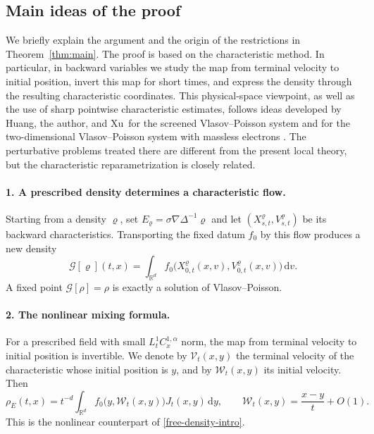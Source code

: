\documentclass[11pt]{article}
\newcommand{\R}{\mathbb R}
\newcommand{\dd}{\,\mathrm d}
\begin{document}
\subsection{Main ideas of the proof}

We briefly explain the argument and the origin of the restrictions in
Theorem~\ref{thm:main}.  The proof is based on the characteristic method.  In
particular, in backward variables we study the map from terminal velocity to
initial position, invert this map for short times, and express the density
through the resulting characteristic coordinates.  This physical-space
viewpoint, as well as the use of sharp pointwise characteristic estimates,
follows ideas developed by Huang, the author, and Xu\ for the screened Vlasov--Poisson system and for the
two-dimensional Vlasov--Poisson system with massless electrons
\cite{HNXscreened,HNX2d}.  The perturbative problems treated there are
different from the present local theory, but the characteristic
reparametrization is closely related.

\paragraph{1. A prescribed density determines a characteristic flow.}
Starting from a density $\varrho$, set
$E_\varrho=\sigma\nabla\Delta^{-1}\varrho$ and let
$(X_{s,t}^\varrho,V_{s,t}^\varrho)$ be its backward characteristics.
Transporting the fixed datum $f_0$ by this flow
produces a new density
\begin{equation*}
 \mathcal G[\varrho](t,x)
 =\int_{\R^d}f_0\bigl(X_{0,t}^\varrho(x,v),
                         V_{0,t}^\varrho(x,v)\bigr)\dd v.
\end{equation*}
A fixed point $\mathcal G[\rho]=\rho$ is exactly a solution of
Vlasov--Poisson.

\paragraph{2. The nonlinear mixing formula.}
For a prescribed field with small $L^1_tC^{1,\alpha}_x$ norm, the map from terminal
velocity to initial position is invertible.  We denote by
$\mathcal V_t(x,y)$ the terminal velocity of the characteristic whose
initial position is $y$, and by $\mathcal W_t(x,y)$ its initial velocity.
Then
\begin{equation}\label{density-formula-intro}
 \rho_E(t,x)=t^{-d}\int_{\R^d}
 f_0\bigl(y,\mathcal W_t(x,y)\bigr)J_t(x,y)\dd y,
 \qquad \mathcal W_t(x,y)=\frac{x-y}{t}+O(1).
\end{equation}
This is the nonlinear counterpart of \eqref{free-density-intro}.
\end{document}
